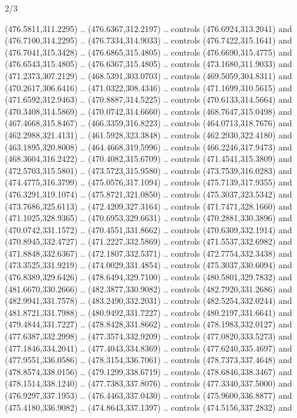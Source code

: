 \begin{flagdescription}{2/3}
\begin{scope}[xshift=0.5\flaglength,yshift=0.5\flagwidth,scale=\flagwidth/495.65]
\begin{scope}[y=0.8pt, x=0.8pt, yscale=-1,shift={(-463.76,-309.78)}]
  (476.5811,311.2295) .. (476.6367,312.2197) .. controls (476.6924,313.2041) and
  (476.7100,314.2295) .. (476.7334,314.9033) .. controls (476.7422,315.1641) and
  (476.7041,315.3428) .. (476.6865,315.4805) .. controls (476.6690,315.4775) and
  (476.6543,315.4805) .. (476.6367,315.4805) .. controls (473.1680,311.9033) and
  (471.2373,307.2129) .. (468.5391,303.0703) .. controls (469.5059,304.8311) and
  (470.2617,306.6416) .. (471.0322,308.4346) .. controls (471.1699,310.5615) and
  (471.6592,312.9463) .. (470.8887,314.5225) .. controls (470.6133,314.5664) and
  (470.3408,314.5869) .. (470.0742,314.6660) .. controls (468.7647,315.0498) and
  (467.4668,315.8467) .. (466.3359,316.8223) .. controls (464.0713,318.7676) and
  (462.2988,321.4131) .. (461.5928,323.3848) .. controls (462.2930,322.4180) and
  (463.1895,320.8008) .. (464.4668,319.5996) .. controls (466.2246,317.9473) and
  (468.3604,316.2422) .. (470.4082,315.6709) .. controls (471.4541,315.3809) and
  (472.5703,315.5801) .. (473.5723,315.9580) .. controls (473.7539,316.0283) and
  (474.4775,316.3799) .. (475.0576,317.1094) .. controls (475.7139,317.9355) and
  (476.3291,319.1074) .. (475.8721,321.0850) .. controls (475.3037,323.5342) and
  (473.7686,325.6113) .. (472.4209,327.3164) .. controls (471.7471,328.1660) and
  (471.1025,328.9365) .. (470.6953,329.6631) .. controls (470.2881,330.3896) and
  (470.0742,331.1572) .. (470.4551,331.8662) .. controls (470.6309,332.1914) and
  (470.8945,332.4727) .. (471.2227,332.5869) .. controls (471.5537,332.6982) and
  (471.8848,332.6367) .. (472.1807,332.5371) .. controls (472.7754,332.3438) and
  (473.3525,331.9219) .. (474.0029,331.4854) .. controls (475.3037,330.6094) and
  (476.8389,329.6426) .. (478.6494,329.7100) .. controls (480.5801,329.7832) and
  (481.6670,330.2666) .. (482.3877,330.9082) .. controls (482.7920,331.2686) and
  (482.9941,331.7578) .. (483.2490,332.2031) .. controls (482.5254,332.0244) and
  (481.8721,331.7988) .. (480.9492,331.7227) .. controls (480.2197,331.6641) and
  (479.4844,331.7227) .. (478.8428,331.8662) .. controls (478.1983,332.0127) and
  (477.6387,332.2998) .. (477.3574,332.9209) .. controls (477.0820,333.5273) and
  (477.1846,334.2041) .. (477.4043,334.8369) .. controls (477.6240,335.4697) and
  (477.9551,336.0586) .. (478.3154,336.7061) .. controls (478.7373,337.4648) and
  (478.8574,338.0156) .. (479.1299,338.6719) .. controls (478.6846,338.3467) and
  (478.1514,338.1240) .. (477.7383,337.8076) .. controls (477.3340,337.5000) and
  (476.9297,337.1953) .. (476.4463,337.0430) .. controls (475.9600,336.8877) and
  (475.4180,336.9082) .. (474.8643,337.1397) .. controls (474.5156,337.2832) and

\end{scope}
\end{scope}
\end{flagdescription}

